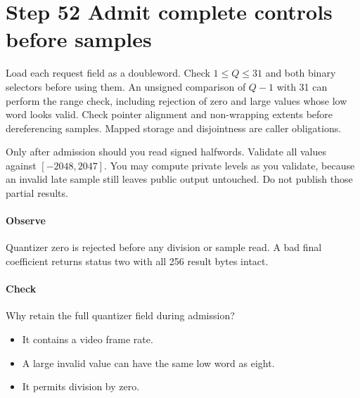 \section{Step 52 Admit complete controls before samples}\label{h263-quant-s02}
Load each request field as a doubleword. Check $1\leq Q\leq31$ and both binary
selectors before using them. An unsigned comparison of $Q-1$ with 31 can perform
the range check, including rejection of zero and large values whose low word
looks valid. Check pointer alignment and non-wrapping extents before dereferencing
samples. Mapped storage and disjointness are caller obligations.

Only after admission should you read signed halfwords. Validate all values against
$[-2048,2047]$. You may compute private levels as you validate, because an invalid
late sample still leaves public output untouched. Do not publish those partial
results.

\paragraph{Observe} Quantizer zero is rejected before any division or sample
read. A bad final coefficient returns status two with all 256 result bytes intact.
\paragraph{Check} Why retain the full quantizer field during admission?
\begin{itemize}
  \item[A.] It contains a video frame rate.
  \item[B.] A large invalid value can have the same low word as eight.
  \item[C.] It permits division by zero.
\end{itemize}
